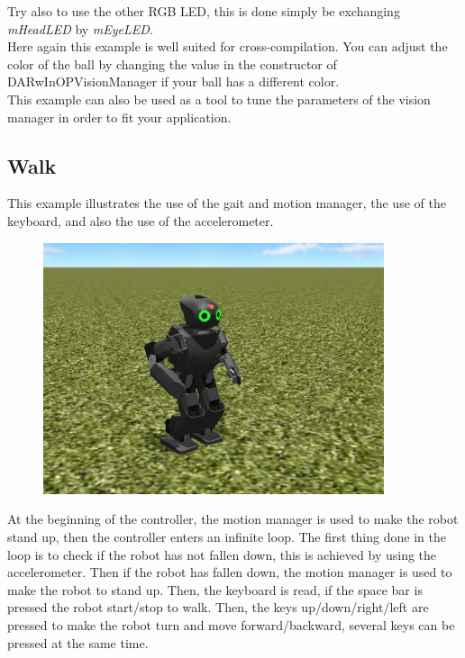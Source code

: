 \documentclass[a4paper, 12pt]{article}  		%
\begin{document}
Try also to use the other RGB LED, this is done simply be exchanging \textit{mHeadLED} by \textit{mEyeLED}.\\

Here again this example is well suited for cross-compilation. You can adjust the color of the ball by changing the value in the constructor of DARwInOPVisionManager if your ball has a different color.\\

This example can also be used as a tool to tune the parameters of the vision manager in order to fit your application.\\


\newpage
\subsection{Walk}

This example illustrates the use of the gait and motion manager, the use of the keyboard, and also the use of the accelerometer.\\

\begin{figure}[H]
\begin{center}
\includegraphics[width=10cm]{example_walk.png}
\label{example_walk.png}
\end{center}
\end{figure}

At the beginning of the controller, the motion manager is used to make the robot stand up, then the controller enters an infinite loop.
The first thing done in the loop is to check if the robot has not fallen down, this is achieved by using the accelerometer. Then if the robot has fallen down, the motion manager is used to make the robot to stand up. 
Then, the keyboard is read, if the space bar is pressed the robot start/stop to walk.
Then, the keys up/down/right/left are pressed to make the robot turn and move forward/backward, several keys can be pressed at the same time.\\
\end{document}
